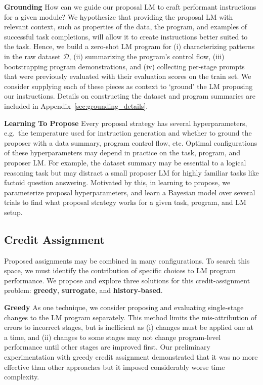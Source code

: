 \textbf{Grounding} How can we guide our proposal LM to craft performant instructions for a given module? We hypothesize that providing the proposal LM with relevant context, such as properties of the data, the program, and examples of successful task completions, will allow it to create instructions better suited to the task. Hence, we build a zero-shot LM program for (i) characterizing patterns in the raw dataset $\mathcal{D}$, (ii) summarizing the program's control flow, (iii) bootstrapping program demonstrations, and (iv) collecting per-stage prompts that were previously evaluated with their evaluation scores on the train set.  We consider supplying each of these pieces as context to `ground' the LM proposing our instructions. Details on constructing the dataset and program summaries are included in Appendix~\ref{sec:grounding_details}.




\textbf{Learning To Propose}
Every proposal strategy has several hyperparameters, e.g.\ the temperature used for instruction generation and whether to ground the proposer with a data summary, program control flow, etc. Optimal configurations of these hyperparameters may depend in practice on the task, program, and proposer LM. For example, the dataset summary may be essential to a logical reasoning task but may distract a small proposer LM for highly familiar tasks like factoid question answering.  Motivated by this, in learning to propose, we parameterize proposal hyperparameters, and learn a Bayesian model over several trials to find what proposal strategy works for a given task, program, and LM setup.



\subsection{Credit Assignment}
Proposed assignments may be combined in many configurations. To search this space, we must identify the contribution of specific choices to LM program performance. We propose and explore three solutions for this credit-assignment problem: \textbf{greedy}, \textbf{surrogate}, and \textbf{history-based}. %

\textbf{Greedy}
As one technique, we consider proposing and evaluating single-stage changes to the LM program separately. This method limits the mis-attribution of errors to incorrect stages, but is inefficient as (i) changes must be applied one at a time, and (ii) changes to some stages may not change program-level performance until other stages are improved first.  Our preliminary experimentation with greedy credit assignment demonstrated that it was no more effective than other approaches but it imposed considerably worse time complexity.


